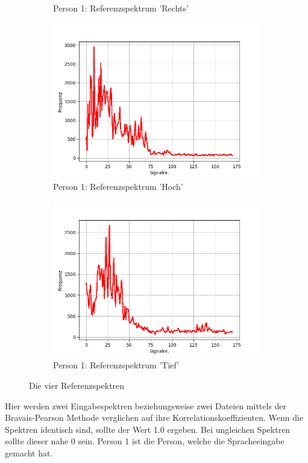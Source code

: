\documentclass[12pt, oneside, a4paper, \docLanguage]{report}
\begin{document}
\begin{figure}[H]
\begin{subfigure}{.5\textwidth}
  		\caption{Person 1: Referenzspektrum 'Rechts'}
  		\label{fig:sub2}
	\end{subfigure}
\begin{subfigure}{.5\textwidth}
  		\centering
 		 \includegraphics[width=.95\linewidth]{../data/img/Versuch2/2Averagehoch.png}
  		\caption{Person 1: Referenzspektrum 'Hoch'}
 		 \label{fig:sub3}
	\end{subfigure}%
	\begin{subfigure}{.5\textwidth}
  		\centering
 		 \includegraphics[width=.95\linewidth]{../data/img/Versuch2/2Averagetief.png}
  		\caption{Person 1: Referenzspektrum 'Tief'}
  		\label{fig:sub4}
	\end{subfigure}
	\caption{Die vier Referenzspektren}
	\label{fig:2test}
\end{figure}
\newpage
Hier werden zwei Eingabespektren beziehungsweise zwei Dateien mittels der Bravais-Pearson Methode verglichen auf ihre Korrelationskoeffizienten.
\newline
Wenn die Spektren identisch sind, sollte der Wert 1.0 ergeben. Bei ungleichen Spektren sollte dieser nahe 0 sein.
Person 1 ist die Person, welche die Spracheeingabe gemacht hat.
\end{document}
